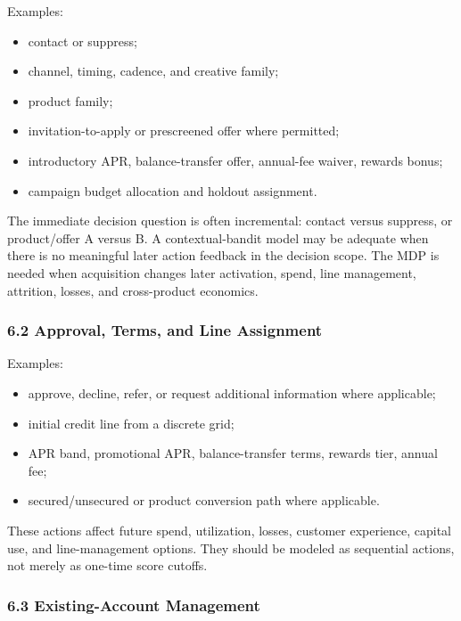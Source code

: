 \documentclass[
]{article}
\providecommand{\tightlist}{%
  \setlength{\itemsep}{0pt}\setlength{\parskip}{0pt}}
\begin{document}
Examples:

\begin{itemize}
\tightlist
\item
  contact or suppress;
\item
  channel, timing, cadence, and creative family;
\item
  product family;
\item
  invitation-to-apply or prescreened offer where permitted;
\item
  introductory APR, balance-transfer offer, annual-fee waiver, rewards
  bonus;
\item
  campaign budget allocation and holdout assignment.
\end{itemize}

The immediate decision question is often incremental: contact versus
suppress, or product/offer A versus B. A contextual-bandit model may be
adequate when there is no meaningful later action feedback in the
decision scope. The MDP is needed when acquisition changes later
activation, spend, line management, attrition, losses, and cross-product
economics.

\hypertarget{approval-terms-and-line-assignment}{%
\subsubsection{6.2 Approval, Terms, and Line
Assignment}\label{approval-terms-and-line-assignment}}

Examples:

\begin{itemize}
\tightlist
\item
  approve, decline, refer, or request additional information where
  applicable;
\item
  initial credit line from a discrete grid;
\item
  APR band, promotional APR, balance-transfer terms, rewards tier,
  annual fee;
\item
  secured/unsecured or product conversion path where applicable.
\end{itemize}

These actions affect future spend, utilization, losses, customer
experience, capital use, and line-management options. They should be
modeled as sequential actions, not merely as one-time score cutoffs.

\hypertarget{existing-account-management}{%
\subsubsection{6.3 Existing-Account
Management}\label{existing-account-management}}
\end{document}
